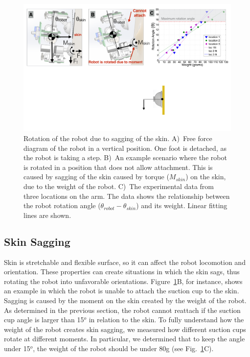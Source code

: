 \begin{figure}[!t]
\centering
\includegraphics[width=14cm]{pictures/chapter3/sagging_exp.pdf}
\caption{Rotation of the robot due to sagging of the skin. A)~Free force diagram of the robot in a vertical position. One foot is detached, as the robot is taking a step. B)~An example scenario where the robot is rotated in a position that does not allow attachment. This is caused by sagging of the skin caused by torque ($M_{skin}$) on the skin, due to the weight of the robot. C)~The experimental data from three locations on the arm. The data shows the relationship between the robot rotation angle ($\theta_{robot} - \theta_{skin}$) and its weight. Linear fitting lines are shown.}
\label{fig:sagging_exp}
\end{figure}

\subsection{Skin Sagging}
Skin is stretchable and flexible surface, so it can affect the robot locomotion and orientation. These properties can create situations in which the skin sags, thus rotating the robot into unfavorable orientations. Figure~\ref{fig:sagging_exp}B, for instance, shows an example in which the robot is unable to attach the suction cup to the skin. Sagging is caused by the moment on the skin created by the weight of the robot. As determined in the previous section, the robot cannot reattach if the suction cup angle is larger than 15$^o$ in relation to the skin. To fully understand how the weight of the robot creates skin sagging, we measured how different suction cups rotate at different moments. In particular, we determined that to keep the angle under 15$^o$, the weight of the robot should be under 80g (see Fig.~\ref{fig:sagging_exp}C).

